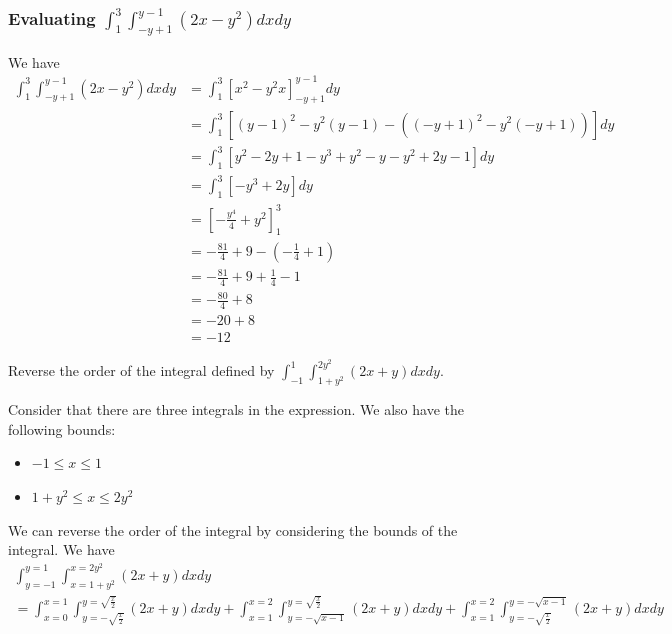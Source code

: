 \documentclass{article}
\begin{document}
\begin{examplebox}
\begin{solutionbox}
        \subsubsection*{Evaluating \( \int_{1}^{3} \int_{-y + 1}^{y - 1} (2x - y^2) dxdy \)}
        We have
        \begin{align*}
            \int_{1}^{3} \int_{-y + 1}^{y - 1} (2x - y^2) dxdy & = \int_{1}^{3} \left[ x^2 - y^2x \right]_{-y + 1}^{y - 1} dy \\
            & = \int_{1}^{3} \left[ (y - 1)^2 - y^2(y - 1) - ((-y + 1)^2 - y^2(-y + 1)) \right] dy \\
            & = \int_{1}^{3} \left[ y^2 - 2y + 1 - y^3 + y^2 - y - y^2 + 2y - 1 \right] dy \\
            & = \int_{1}^{3} \left[ -y^3 + 2y \right] dy \\
            & = \left[ -\frac{y^4}{4} + y^2 \right]_{1}^{3} \\
            & = -\frac{81}{4} + 9 - \left( -\frac{1}{4} + 1 \right) \\
            & = -\frac{81}{4} + 9 + \frac{1}{4} - 1 \\
            & = -\frac{80}{4} + 8 \\
            & = -20 + 8 \\
            & = -12
        \end{align*}
    \end{solutionbox}

\end{examplebox}

\begin{examplebox}
    Reverse the order of the integral defined by \( \int_{-1}^{1} \int_{1 + y^2}^{2y^2} (2x + y) dxdy \).

    \begin{solutionbox}
        Consider that there are three integrals in the expression. We also have the following bounds:
        \begin{itemize}
            \item \( -1 \leq x \leq 1 \)
            \item \( 1 + y^2 \leq x \leq 2y^2 \)
        \end{itemize}
        We can reverse the order of the integral by considering the bounds of the integral. We have
        \begin{align*}
            \int_{y = -1}^{y = 1} \int_{x = 1 + y^2}^{x = 2y^2} (2x + y) dxdy \\
            = \int_{x = 0}^{x = 1} \int_{y = -\sqrt{\frac{x}{2}}}^{y = \sqrt{\frac{x}{2}} } (2x + y) dx dy + \int_{x = 1}^{x = 2} \int_{y = -\sqrt{x - 1}}^{y = \sqrt{\frac{x}{2}}} (2x + y) dx dy + \int_{x = 1}^{x = 2} \int_{y = -\sqrt{\frac{x}{2}}}^{y = -\sqrt{x - 1}} (2x + y) dx dy \\
        \end{align*}
    \end{solutionbox}
\end{examplebox}
\end{document}
